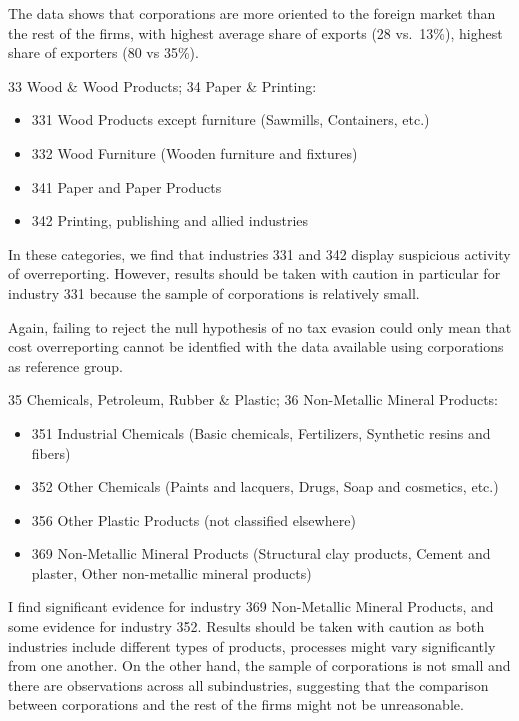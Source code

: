\documentclass[
  12pt]{article}
\providecommand{\tightlist}{%
  \setlength{\itemsep}{0pt}\setlength{\parskip}{0pt}}\usepackage{longtable,booktabs,array}
\theoremstyle{definition}
\theoremstyle{remark}
\begin{document}
The data shows that corporations are more oriented to the foreign market
than the rest of the firms, with highest average share of exports (28
vs.~13\%), highest share of exporters (80 vs 35\%).

33 Wood \& Wood Products; 34 Paper \& Printing:

\begin{itemize}
\tightlist
\item
  331 Wood Products except furniture (Sawmills, Containers, etc.)
\item
  332 Wood Furniture (Wooden furniture and fixtures)
\item
  341 Paper and Paper Products
\item
  342 Printing, publishing and allied industries
\end{itemize}

In these categories, we find that industries 331 and 342 display
suspicious activity of overreporting. However, results should be taken
with caution in particular for industry 331 because the sample of
corporations is relatively small.

Again, failing to reject the null hypothesis of no tax evasion could
only mean that cost overreporting cannot be identfied with the data
available using corporations as reference group.

35 Chemicals, Petroleum, Rubber \& Plastic; 36 Non-Metallic Mineral
Products:

\begin{itemize}
\tightlist
\item
  351 Industrial Chemicals (Basic chemicals, Fertilizers, Synthetic
  resins and fibers)
\item
  352 Other Chemicals (Paints and lacquers, Drugs, Soap and cosmetics,
  etc.)
\item
  356 Other Plastic Products (not classified elsewhere)
\item
  369 Non-Metallic Mineral Products (Structural clay products, Cement
  and plaster, Other non-metallic mineral products)
\end{itemize}

I find significant evidence for industry 369 Non-Metallic Mineral
Products, and some evidence for industry 352. Results should be taken
with caution as both industries include different types of products,
processes might vary significantly from one another. On the other hand,
the sample of corporations is not small and there are observations
across all subindustries, suggesting that the comparison between
corporations and the rest of the firms might not be unreasonable.
\end{document}

